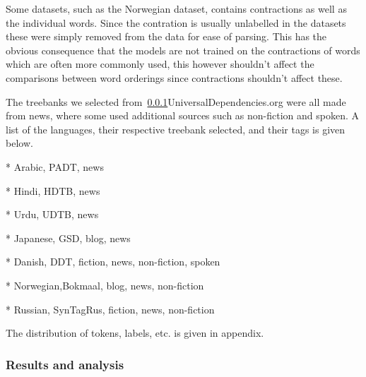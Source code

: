 Some datasets, such as the Norwegian dataset, contains contractions as well as
the individual words. Since the contration is usually unlabelled in the datasets
these were simply removed from the data for ease of parsing. This has the
obvious consequence that the models are not trained on the contractions of words
which are often more commonly used, this however shouldn't affect the
comparisons between word orderings since contractions shouldn't affect these.

The treebanks we selected from~\ref{}{UniversalDependencies.org} were all made
from news, where some used additional sources such as non-fiction and spoken. A
list of the languages, their respective treebank selected, and their tags is
given below.

* Arabic,   PADT, news

* Hindi,    HDTB, news

* Urdu,     UDTB, news

* Japanese, GSD, blog, news

* Danish,   DDT, fiction, news, non-fiction, spoken

* Norwegian,Bokmaal, blog, news, non-fiction

* Russian,  SynTagRus, fiction, news, non-fiction

The distribution of tokens, labels, etc. is given in appendix.

\subsubsection{Results and analysis}


\pagebreak
